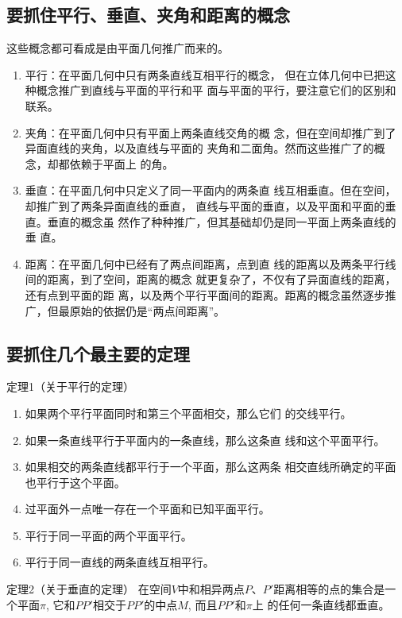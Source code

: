 \subsection{要抓住平行、垂直、夹角和距离的概念}

这些概念都可看成是由平面几何推广而来的。
\begin{enumerate}
\item 平行：在平面几何中只有两条直线互相平行的概念，
但在立体几何中已把这种概念推广到直线与平面的平行和平
面与平面的平行，要注意它们的区别和联系。
\item 夹角：在平面几何中只有平面上两条直线交角的概
念，但在空间却推广到了异面直线的夹角，以及直线与平面的
夹角和二面角。然而这些推广了的概念，却都依赖于平面上
的角。
\item 垂直：在平面几何中只定义了同一平面内的两条直
线互相垂直。但在空间，却推广到了两条异面直线的垂直，
直线与平面的垂直，以及平面和平面的垂直。垂直的概念虽
然作了种种推广，但其基础却仍是同一平面上两条直线的垂
直。
\item 距离：在平面几何中已经有了两点间距离，点到直
线的距离以及两条平行线间的距离，到了空间，距离的概念
就更复杂了，不仅有了异面直线的距离，还有点到平面的距
离，以及两个平行平面间的距离。距离的概念虽然逐步推
广，但最原始的依据仍是“两点间距离”。
\end{enumerate}

\subsection{要抓住几个最主要的定理}
\begin{blk}
    {定理1（关于平行的定理）}
\begin{enumerate}
\item 如果两个平行平面同时和第三个平面相交，那么它们
的交线平行。
\item 如果一条直线平行于平面内的一条直线，那么这条直
线和这个平面平行。
\item 如果相交的两条直线都平行于一个平面，那么这两条
相交直线所确定的平面也平行于这个平面。
\item 过平面外一点唯一存在一个平面和已知平面平行。
\item 平行于同一平面的两个平面平行。
\item 平行于同一直线的两条直线互相平行。
\end{enumerate}
\end{blk}




\begin{blk}
    {定理2（关于垂直的定理）}
在空间$V$中和相异两点$P$、$P'$距离相等的点的集合是一
个平面$\pi$, 它和$PP'$相交于$PP'$的中点$M$, 而且$PP'$和$\pi$上
的任何一条直线都垂直。
\end{blk}

